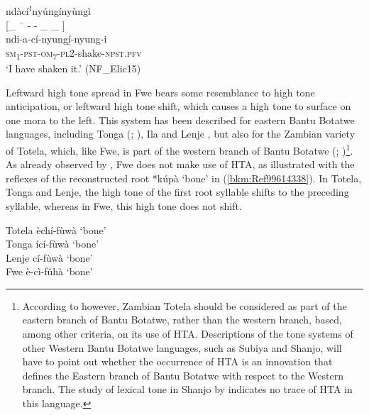 \ea
\label{bkm:Ref494903100}
ndàcíꜝnyúngínyùngì\\
{[\_  ¯  - - \_ \_ ]}\\
ndi-a-cí-nyungí̲-nyung-i\\
\textsc{sm}\textsubscript{1}-\textsc{pst}-\textsc{om}\textsubscript{7}-\textsc{pl}2-shake-\textsc{npst}.\textsc{pfv}\\
\glt ‘I have shaken it.’ (NF\_Elic15)
\z

Leftward high tone spread in Fwe bears some resemblance to high tone anticipation, or leftward high tone shift, which causes a high tone to surface on one mora to the left. This system has been described for eastern Bantu Botatwe languages, including Tonga (\citealt{Goldsmith1984}; \citealt{Meeussen1963}), Ila and Lenje \citep{Bostoen2009}, but also for the Zambian variety of Totela, which, like Fwe, is part of the western branch of Bantu Botatwe (\citealt{Crane2014}; \citealt{Crane2011})\footnote{According to \citet[55]{Crane2011} however, Zambian Totela should be considered as part of the eastern branch of Bantu Botatwe, rather than the western branch, based, among other criteria, on its use of HTA. Descriptions of the tone systems of other Western Bantu Botatwe languages, such as Subiya and Shanjo, will have to point out whether the occurrence of HTA is an innovation that defines the Eastern branch of Bantu Botatwe with respect to the Western branch. The study of lexical tone in Shanjo by \citet{Bostoen2009} indicates no trace of HTA in this language.}. As already observed by {\citet[123]{Bostoen2009}}, Fwe does not make use of HTA, as illustrated with the reflexes of the reconstructed root *kúpà ‘bone’ in (\ref{bkm:Ref99614338}). In Totela, Tonga and Lenje, the high tone of the first root syllable shifts to the preceding syllable, whereas in Fwe, this high tone does not shift.

\ea
\label{bkm:Ref99614338}
Totela   èchí-fùwà  ‘bone’ \citep[65]{Crane2014}\\
Tonga  ící-fùwà  ‘bone’ \citep[65]{Carter1962}\\
Lenje    cí-fùwà  ‘bone’ \citep[49]{Kagaya1987}\\
Fwe    è-cì-fûhà  ‘bone’
\z
